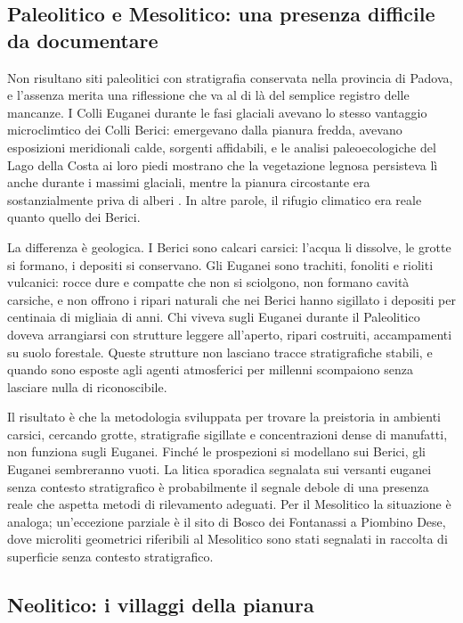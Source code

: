 \subsection{Paleolitico e Mesolitico: una presenza difficile da documentare}

Non risultano siti paleolitici con stratigrafia conservata nella provincia di Padova, e l'assenza merita una riflessione che va al di là del semplice registro delle mancanze. I Colli Euganei durante le fasi glaciali avevano lo stesso vantaggio microclimtico dei Colli Berici: emergevano dalla pianura fredda, avevano esposizioni meridionali calde, sorgenti affidabili, e le analisi paleoecologiche del Lago della Costa ai loro piedi mostrano che la vegetazione legnosa persisteva lì anche durante i massimi glaciali, mentre la pianura circostante era sostanzialmente priva di alberi \citep{kaltenrieder2009}. In altre parole, il rifugio climatico era reale quanto quello dei Berici.

La differenza è geologica. I Berici sono calcari carsici: l'acqua li dissolve, le grotte si formano, i depositi si conservano. Gli Euganei sono trachiti, fonoliti e rioliti vulcanici: rocce dure e compatte che non si sciolgono, non formano cavità carsiche, e non offrono i ripari naturali che nei Berici hanno sigillato i depositi per centinaia di migliaia di anni. Chi viveva sugli Euganei durante il Paleolitico doveva arrangiarsi con strutture leggere all'aperto, ripari costruiti, accampamenti su suolo forestale. Queste strutture non lasciano tracce stratigrafiche stabili, e quando sono esposte agli agenti atmosferici per millenni scompaiono senza lasciare nulla di riconoscibile.

Il risultato è che la metodologia sviluppata per trovare la preistoria in ambienti carsici, cercando grotte, stratigrafie sigillate e concentrazioni dense di manufatti, non funziona sugli Euganei. Finché le prospezioni si modellano sui Berici, gli Euganei sembreranno vuoti. La litica sporadica segnalata sui versanti euganei senza contesto stratigrafico è probabilmente il segnale debole di una presenza reale che aspetta metodi di rilevamento adeguati. Per il Mesolitico la situazione è analoga; un'eccezione parziale è il sito di Bosco dei Fontanassi a Piombino Dese, dove microliti geometrici riferibili al Mesolitico sono stati segnalati in raccolta di superficie senza contesto stratigrafico.

\subsection{Neolitico: i villaggi della pianura}

